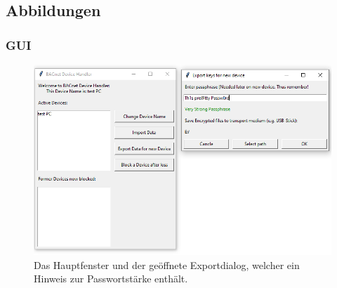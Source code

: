 \documentclass[a4paper,titlepage]{article}
\begin{document}
\newpage

	\subsection{Abbildungen}
		\subsubsection{GUI} 	\label{fig:UI}
		\begin{figure}[H] %
			\centering
			\includegraphics[width=1\textwidth]{figures/UIexport}
			\caption*{Das Hauptfenster und der geöffnete Exportdialog, welcher ein Hinweis zur Passwortstärke enthält.}
		\end{figure}
		
		\subsubsection{}
		
\end{document}
